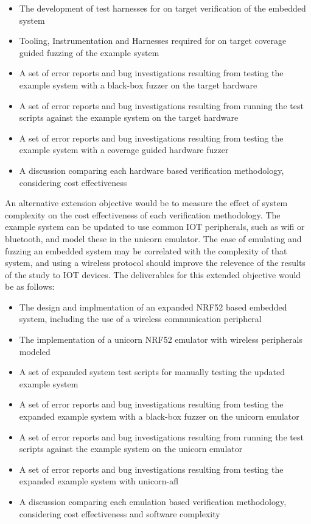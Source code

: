 \documentclass[11pt]{article}
\begin{document}
\begin{itemize}
\item The development of test harnesses for on target verification of the embedded system
\item Tooling, Instrumentation and Harnesses required for on target coverage guided fuzzing of the example system
\item A set of error reports and bug investigations resulting from testing the example system with a black-box fuzzer on the target hardware
\item A set of error reports and bug investigations resulting from running the test scripts against the example system on the target hardware
\item A set of error reports and bug investigations resulting from testing the example system with a coverage guided hardware fuzzer
\item A discussion comparing each hardware based verification methodology, considering cost effectiveness
\end{itemize}

An alternative extension objective would be to measure the effect of system
complexity on the cost effectiveness of each verification methodology.
The example system can be updated to use common IOT peripherals, such as wifi
or bluetooth, and model these in the unicorn emulator. The ease of emulating
and fuzzing an embedded system may be correlated with the complexity of that
system, and using a wireless protocol should improve the relevence of the
results of the study to IOT devices. The deliverables for this extended objective would be as follows:

\begin{itemize}
\item The design and implmentation of an expanded NRF52 based embedded system, including the use of a wireless communication peripheral
\item The implementation of a unicorn NRF52 emulator with wireless peripherals modeled
\item A set of expanded system test scripts for manually testing the updated example system
\item A set of error reports and bug investigations resulting from testing the expanded example system with a black-box fuzzer on the unicorn emulator
\item A set of error reports and bug investigations resulting from running the test scripts against the example system on the unicorn emulator
\item A set of error reports and bug investigations resulting from testing the expanded example system with unicorn-afl
\item A discussion comparing each emulation based verification methodology, considering cost effectiveness and software complexity
\end{itemize}
\end{document}
